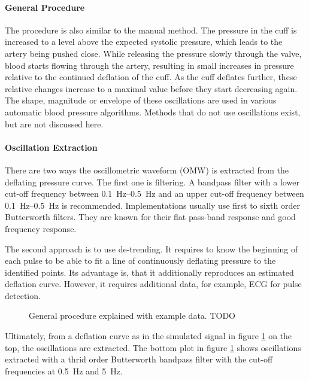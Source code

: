 \paragraph{General Procedure} The procedure is also similar to the manual method. The pressure in the cuff is increased to a level above the expected systolic pressure, which leads to the artery being pushed close. While releasing the pressure slowly through the valve, blood starts flowing through the artery, resulting in small increases in pressure relative to the continued deflation of the cuff. As the cuff deflates further, these relative changes increase to a maximal value before they start decreasing again.\cite{Forouzanfar2015,Drzewiecki1994,Ursino1996} The shape, magnitude or envelope of these oscillations are used in various automatic blood pressure algorithms. Methods that do not use oscillations exist, but are not discussed here. 


\paragraph{Oscillation Extraction} There are two ways the oscillometric waveform (OMW) is extracted from the deflating pressure curve. The first one is filtering. A bandpass filter with a lower cut-off frequency between \SIrange{0.1}{0.5}{\Hz} and an upper cut-off frequency between \SIrange{0.1}{0.5}{\Hz} is recommended. \cite{Forouzanfar2015} Implementations usually use first \cite{Lim2015} to sixth order \cite{Jazbinsek2010} Butterworth filters. They are known for their flat pass-band response and good frequency response. 

The second approach is to use de-trending. It requires to know the beginning of each pulse to be able to fit a line of continuously deflating pressure to the identified points. Its advantage is, that it additionally reproduces an estimated deflation curve. However, it requires additional data, for example, ECG for pulse detection.\cite{Forouzanfar2015}

\begin{figure}[h]
\centering
\caption{General procedure explained with example data. TODO}
\label{fig:osc}
\end{figure}

Ultimately, from a deflation curve as in the simulated signal in figure \ref{fig:osc} on the top, the oscillations are extracted. The bottom plot in figure \ref{fig:osc} shows oscillations extracted with a thrid order Butterworth bandpass filter with the cut-off frequencies at \SI{0.5}{\Hz} and \SI{5}{\Hz}. \cite{Babbs2012} 


